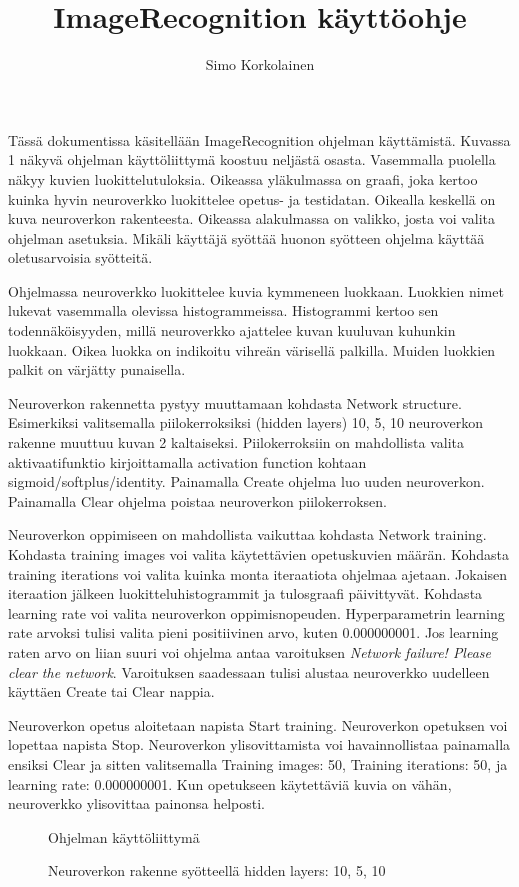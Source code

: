 \documentclass[12pt]{article}
\author{Simo Korkolainen}
\title{ImageRecognition käyttöohje}
\begin{document}
  \maketitle
  
Tässä dokumentissa käsitellään ImageRecognition ohjelman käyttämistä. Kuvassa 1 näkyvä ohjelman käyttöliittymä koostuu neljästä osasta. Vasemmalla puolella näkyy kuvien luokittelutuloksia. Oikeassa yläkulmassa on graafi, joka kertoo kuinka hyvin neuroverkko luokittelee opetus- ja testidatan. Oikealla keskellä on kuva neuroverkon rakenteesta. Oikeassa alakulmassa on valikko, josta voi valita ohjelman asetuksia. Mikäli käyttäjä syöttää huonon syötteen ohjelma käyttää oletusarvoisia syötteitä. 

Ohjelmassa neuroverkko luokittelee kuvia kymmeneen luokkaan. Luokkien nimet lukevat vasemmalla olevissa histogrammeissa. Histogrammi kertoo sen todennäköisyyden, millä neuroverkko ajattelee kuvan kuuluvan kuhunkin luokkaan. Oikea luokka on indikoitu vihreän värisellä palkilla. Muiden luokkien palkit on värjätty punaisella.

Neuroverkon rakennetta pystyy muuttamaan kohdasta Network structure. Esimerkiksi valitsemalla piilokerroksiksi (hidden layers) 10, 5, 10 neuroverkon rakenne muuttuu kuvan 2 kaltaiseksi. Piilokerroksiin on mahdollista valita aktivaatifunktio kirjoittamalla activation function kohtaan sigmoid/softplus/identity. 
Painamalla Create ohjelma luo uuden neuroverkon. Painamalla Clear ohjelma poistaa neuroverkon piilokerroksen.

Neuroverkon oppimiseen on mahdollista vaikuttaa kohdasta Network training. Kohdasta training images voi valita käytettävien opetuskuvien määrän. Kohdasta training iterations voi valita kuinka monta iteraatiota ohjelmaa ajetaan. Jokaisen iteraation jälkeen luokitteluhistogrammit ja tulosgraafi päivittyvät. Kohdasta learning rate voi valita neuroverkon oppimisnopeuden. Hyperparametrin learning rate arvoksi tulisi valita pieni positiivinen arvo, kuten 0.000000001. Jos learning raten arvo on liian suuri voi ohjelma antaa varoituksen \textit{Network failure! Please clear the network}. Varoituksen saadessaan tulisi alustaa neuroverkko uudelleen käyttäen Create tai Clear nappia.

Neuroverkon opetus aloitetaan napista Start training. Neuroverkon opetuksen voi lopettaa napista Stop. Neuroverkon ylisovittamista voi havainnollistaa painamalla ensiksi Clear ja sitten valitsemalla
 Training images: 50,
Training iterations: 50, ja
learning rate: 0.000000001.
Kun opetukseen käytettäviä kuvia on vähän, neuroverkko ylisovittaa painonsa helposti.

\begin{figure}
\caption{Ohjelman käyttöliittymä}
\end{figure}


\begin{figure}
\caption{Neuroverkon rakenne syötteellä hidden layers: 10, 5, 10}
\end{figure}
\end{document}
